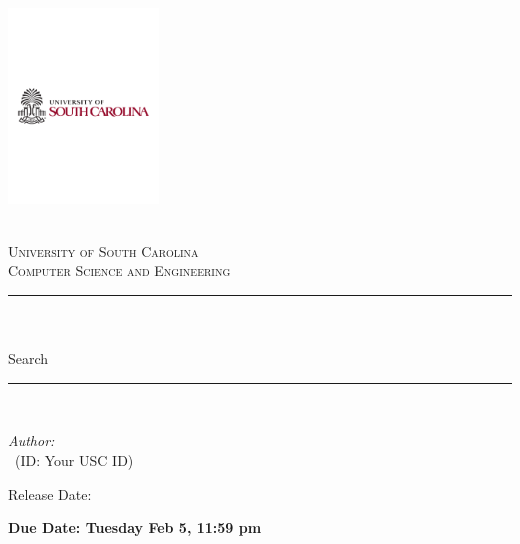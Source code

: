 \begin{titlepage}

\newcommand{\HRule}{\rule{\linewidth}{0.5mm}} %



\includegraphics[width = 4cm]{./figures/usc}\\[0.5cm] 

\begin{center} %

\textsc{\LARGE \reporttype}\\[1.5cm] 
\textsc{\Large University of South Carolina}\\[0.5cm] 
\textsc{\large Computer Science and Engineering}\\[0.5cm] 

\HRule \\[0.4cm]
{ \huge \bfseries \reporttitle}\\ %
{\Large Search}
\HRule \\[1.5cm]
\end{center}

\begin{flushleft} \large
\textit{Author:}\\
\reportauthor~(ID: Your USC ID) %
\end{flushleft}
\vspace{2cm}
\makeatletter
Release Date: \@date 

\textbf{Due Date: Tuesday Feb 5, 11:59 pm}

\vfill %



\makeatother


\end{titlepage}


